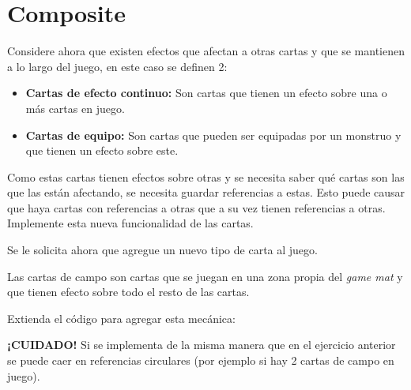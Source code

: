 \section{Composite}
  \begin{Exercise}[
      title={Cartas de efecto continuo},
      label={ex:composite-1}, 
      difficulty=2
    ]
    Considere ahora que existen efectos que afectan a otras cartas y que se mantienen a lo
    largo del juego, en este caso se definen 2:
    \begin{itemize}
      \item \textbf{Cartas de efecto continuo:} Son cartas que tienen un efecto sobre una 
        o más cartas en juego.
      \item \textbf{Cartas de equipo:} Son cartas que pueden ser equipadas por un monstruo 
        y que tienen un efecto sobre este.
    \end{itemize}

    Como estas cartas tienen efectos sobre otras y se necesita saber qué cartas son las 
    que las están afectando, se necesita guardar referencias a estas.
    Esto puede causar que haya cartas con referencias a otras que a su vez tienen 
    referencias a otras.
    Implemente esta nueva funcionalidad de las cartas. 
  \end{Exercise}

  \begin{Exercise}[title={Cartas de campo}, label={ex:composite-2}, difficulty=4]
    Se le solicita ahora que agregue un nuevo tipo de carta al juego.

    Las cartas de campo son cartas que se juegan en una zona propia del \textit{game mat}
    y que tienen efecto sobre todo el resto de las cartas.

    Extienda el código para agregar esta mecánica:

    \textbf{¡CUIDADO!} Si se implementa de la misma manera que en el ejercicio anterior se
    puede caer en referencias circulares (por ejemplo si hay 2 cartas de campo en juego).
  \end{Exercise}
%